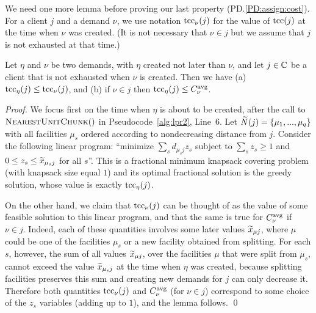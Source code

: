 \documentclass{llncs}
\begin{document}

We need one more lemma before proving our last property
(PD.\ref{PD:assign:cost}).  For a client $j$ and a demand
$\nu$, we use notation $\textrm{tcc}_{\nu}(j)$ for the value of
$\textrm{tcc}(j)$ at the time when $\nu$ was created. (It is not
necessary that $\nu\in j$ but we assume that $j$ is not
exhausted at that time.)


\begin{lemma}\label{lem: tcc optimal}
  Let $\eta$ and $\nu$ be two demands, with $\eta$ created not later
  than $\nu$, and let $j\in\mathbb{C}$ be a client that is not
  exhausted when $\nu$ is created. Then we have (a) $\textrm{tcc}_\eta(j) \le
  \textrm{tcc}_{\nu}(j)$, and (b) if $\nu\in j$ then $\textrm{tcc}_\eta(j) \le
  C^{{\mbox{\scriptsize\rm avg}}}_{\nu}$.

\end{lemma}

\begin{proof}
  We focus first on the time when $\eta$ is about to be created,
  after the call to ${\textsc{NearestUnitChunk}}()$ in
  Pseudocode~\ref{alg:lpr2}, Line~6.  Let ${\widetilde N}(j) =
  \{\mu_1,...,\mu_q\}$ with all facilities $\mu_s$ ordered
  according to nondecreasing distance from $j$.  Consider
  the following linear program:
``minimize $\sum_s d_{\mu_s j}z_s$
	subject to $\sum_s z_s  \ge 1$ and
 	$0 \le z_s \le {\widetilde x}_{\mu_s j}$ for all $s$''.
  This is a fractional
  minimum knapsack covering problem (with knapsack size equal $1$) and its optimal fractional
  solution is the greedy solution, whose value is exactly
  $\textrm{tcc}_\eta(j)$.  

On the other hand, we claim that
  $\textrm{tcc}_\nu(j)$ can be thought of as the value of some feasible
  solution to this linear program, and that the same is true for $C^{{\mbox{\scriptsize\rm avg}}}_{\nu}$ if $\nu\in j$.
  Indeed, each of these
  quantities involves some later values ${\widetilde x}_{\mu j}$,
  where $\mu$ could be one of the facilities $\mu_s$ or a
  new facility obtained from splitting. For each $s$,
  however, the sum of all values ${\widetilde x}_{\mu j}$,
  over the facilities $\mu$ that were split from $\mu_s$, cannot exceed
 the value ${\widetilde x}_{\mu_s j}$ at the time when
  $\eta$ was created, because splitting facilities preserves this sum and
 creating new demands for $j$ can only decrease it.
Therefore both quantities
  $\textrm{tcc}_\nu(j)$ and $C^{{\mbox{\scriptsize\rm avg}}}_{\nu}$ (for $\nu\in j$) correspond to some
  choice of the $z_s$ variables (adding up to $1$), and the
  lemma follows.
\qed
\end{proof}

\end{document}
